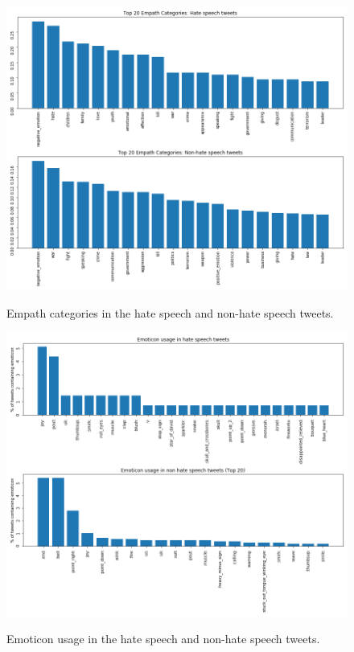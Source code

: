 \documentclass[conference]{IEEEtran}
\begin{document}
\begin{figure}[!t] 
\centering 
\includegraphics[width=5.0in]{liwc_topics} \label{fig:liwc_topics} \hfil 
\caption{Empath categories in the hate speech and non-hate speech tweets.}     
\end{figure} 

\begin{figure}[!t] 
    \centering 
    \includegraphics[width=5.0in]{emoticons} \label{fig:emoticon_usage} \hfil 
    \caption{Emoticon usage in the hate speech and non-hate speech tweets.}     
\end{figure} 
\end{document}
